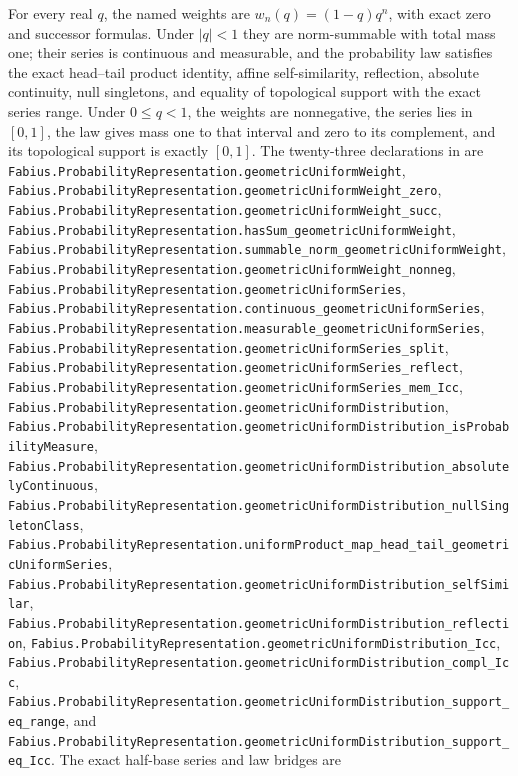 \documentclass[11pt,oneside]{article}
\theoremstyle{definition}
\theoremstyle{remark}
\newcommand{\1}{\mathbf 1}
\begin{document}
\begin{statusbox}
For every real \(q\), the named weights are \(w_n(q)=(1-q)q^n\), with exact zero and
successor formulas.  Under \(|q|<1\) they are norm-summable with total mass one; their
series is continuous and measurable, and the probability law satisfies the exact
head--tail product identity, affine self-similarity, reflection, absolute continuity, null
singletons, and equality of topological support with the exact series range.  Under
\(0\le q<1\), the weights are nonnegative, the series lies in \([0,1]\), the law gives
mass one to that interval and zero to its complement, and its topological support is
exactly \([0,1]\).  The twenty-three declarations in  are
\nolinkurl{Fabius.ProbabilityRepresentation.geometricUniformWeight},
\nolinkurl{Fabius.ProbabilityRepresentation.geometricUniformWeight_zero},
\nolinkurl{Fabius.ProbabilityRepresentation.geometricUniformWeight_succ},
\nolinkurl{Fabius.ProbabilityRepresentation.hasSum_geometricUniformWeight},
\nolinkurl{Fabius.ProbabilityRepresentation.summable_norm_geometricUniformWeight},
\nolinkurl{Fabius.ProbabilityRepresentation.geometricUniformWeight_nonneg},
\nolinkurl{Fabius.ProbabilityRepresentation.geometricUniformSeries},
\nolinkurl{Fabius.ProbabilityRepresentation.continuous_geometricUniformSeries},
\nolinkurl{Fabius.ProbabilityRepresentation.measurable_geometricUniformSeries},
\nolinkurl{Fabius.ProbabilityRepresentation.geometricUniformSeries_split},
\nolinkurl{Fabius.ProbabilityRepresentation.geometricUniformSeries_reflect},
\nolinkurl{Fabius.ProbabilityRepresentation.geometricUniformSeries_mem_Icc},
\nolinkurl{Fabius.ProbabilityRepresentation.geometricUniformDistribution},
\nolinkurl{Fabius.ProbabilityRepresentation.geometricUniformDistribution_isProbabilityMeasure},
\nolinkurl{Fabius.ProbabilityRepresentation.geometricUniformDistribution_absolutelyContinuous},
\nolinkurl{Fabius.ProbabilityRepresentation.geometricUniformDistribution_nullSingletonClass},
\nolinkurl{Fabius.ProbabilityRepresentation.uniformProduct_map_head_tail_geometricUniformSeries},
\nolinkurl{Fabius.ProbabilityRepresentation.geometricUniformDistribution_selfSimilar},
\nolinkurl{Fabius.ProbabilityRepresentation.geometricUniformDistribution_reflection},
\nolinkurl{Fabius.ProbabilityRepresentation.geometricUniformDistribution_Icc},
\nolinkurl{Fabius.ProbabilityRepresentation.geometricUniformDistribution_compl_Icc},
\nolinkurl{Fabius.ProbabilityRepresentation.geometricUniformDistribution_support_eq_range},
and
\nolinkurl{Fabius.ProbabilityRepresentation.geometricUniformDistribution_support_eq_Icc}.
The exact half-base series and law bridges are

\end{statusbox}
\end{document}
